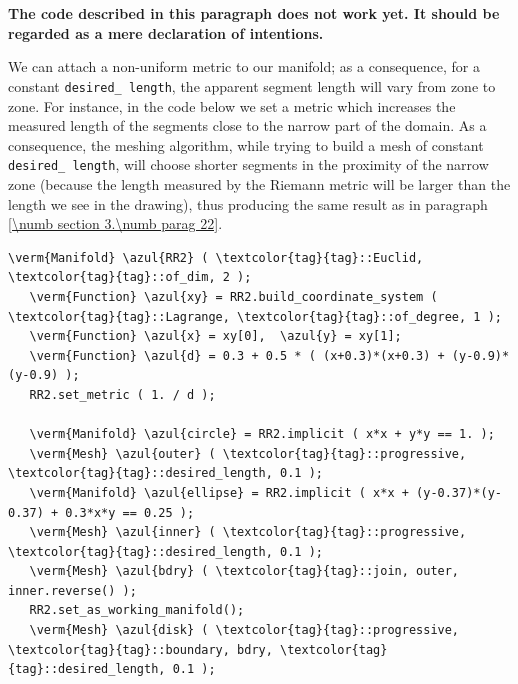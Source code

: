 \section{~~}\label{\numb section 3.\numb parag 23}
 
{\normalfont\bfseries The code described in this paragraph does not work yet.
It should be regarded as a mere declaration of intentions.}
\medskip

We can attach a non-uniform metric to our manifold; as a consequence, for a constant
{\small\tt desired\_\,length}, the apparent segment length will vary from zone to zone.
For instance, in the code below we set a metric which increases the measured length
of the segments close to the narrow part of the domain.
As a consequence, the meshing algorithm, while trying to build a mesh of constant
{\small\tt desired\_\,length}, will choose shorter segments in the proximity of the narrow zone
(because the length measured by the Riemann metric will be larger than the length
we see in the drawing), thus producing the same result as in paragraph
\ref{\numb section 3.\numb parag 22}.

\begin{Verbatim}[commandchars=\\\{\},formatcom=\small\tt,frame=single,
   label=code not working,rulecolor=\color{coment},
   baselinestretch=0.94,framesep=2mm                                   ]
   \verm{Manifold} \azul{RR2} ( \textcolor{tag}{tag}::Euclid, \textcolor{tag}{tag}::of_dim, 2 );
   \verm{Function} \azul{xy} = RR2.build_coordinate_system ( \textcolor{tag}{tag}::Lagrange, \textcolor{tag}{tag}::of_degree, 1 );
   \verm{Function} \azul{x} = xy[0],  \azul{y} = xy[1];
   \verm{Function} \azul{d} = 0.3 + 0.5 * ( (x+0.3)*(x+0.3) + (y-0.9)*(y-0.9) );
   RR2.set_metric ( 1. / d );
   
   \verm{Manifold} \azul{circle} = RR2.implicit ( x*x + y*y == 1. );
   \verm{Mesh} \azul{outer} ( \textcolor{tag}{tag}::progressive, \textcolor{tag}{tag}::desired_length, 0.1 );
   \verm{Manifold} \azul{ellipse} = RR2.implicit ( x*x + (y-0.37)*(y-0.37) + 0.3*x*y == 0.25 );
   \verm{Mesh} \azul{inner} ( \textcolor{tag}{tag}::progressive, \textcolor{tag}{tag}::desired_length, 0.1 );
   \verm{Mesh} \azul{bdry} ( \textcolor{tag}{tag}::join, outer, inner.reverse() );
   RR2.set_as_working_manifold();
   \verm{Mesh} \azul{disk} ( \textcolor{tag}{tag}::progressive, \textcolor{tag}{tag}::boundary, bdry, \textcolor{tag}{tag}::desired_length, 0.1 );
\end{Verbatim}

